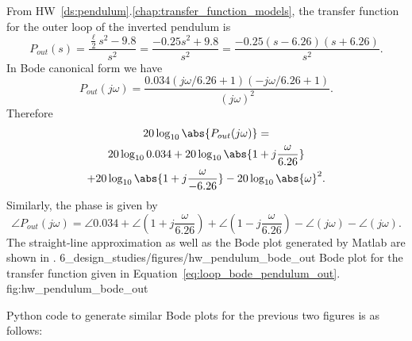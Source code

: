 From HW~\ref{ds:pendulum}.\ref{chap:transfer_function_models}, the transfer function for the outer loop of the inverted pendulum is 
\begin{equation}\label{eq:soln_b20out_tf}
P_{out}(s) = \frac{\frac{\ell}{2}s^2-9.8}{s^2} = 
\frac{-0.25s^2+9.8}{s^2} = \frac{-0.25(s-6.26)(s+6.26)}{s^2}. 
\end{equation}
In Bode canonical form we have
\[
P_{out}(j\omega) = \frac{0.034(j\omega/6.26+1)(-j\omega/6.26+1)}{(j\omega)^2}.
\]
Therefore
\begin{multline} \label{eq:loop_bode_pendulum_out}
20\log_{10}\abs{P_{out}(j\omega)}= \\
	20\log_{10} 0.034 + 	20\log_{10}\abs{1+j\frac{\omega}{6.26}} \\
	+ 	20\log_{10}\abs{1+j\frac{\omega}{-6.26}}
	-20\log_{10}\abs{\omega}^2.
\end{multline}
Similarly, the phase is given by
\[
\angle P_{out}(j\omega) = 
	\angle 0.034 
	+ \angle (1+j\frac{\omega}{6.26})
	+ \angle (1-j\frac{\omega}{6.26})
	- \angle (j\omega)
	- \angle (j\omega).
\]
The straight-line approximation as well as the Bode plot generated by Matlab are shown in .
	{6_design_studies/figures/hw_pendulum_bode_out}
	{Bode plot for the transfer function given in Equation~\eqref{eq:loop_bode_pendulum_out}.}
	{fig:hw_pendulum_bode_out}
	
Python code to generate similar Bode plots for the previous two figures is as follows:


